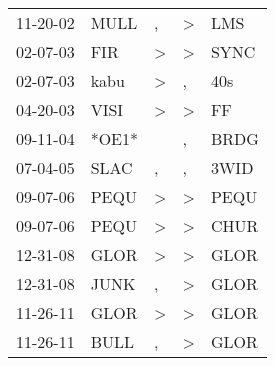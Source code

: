 \begin{supertabular}{lllll}
 11-20-02 &   MULL &             , &  \textgreater &   LMS \\
 02-07-03 &    FIR &  \textgreater &  \textgreater &  SYNC \\
 02-07-03 &   kabu &  \textgreater &             , &   40s \\
 04-20-03 &   VISI &  \textgreater &  \textgreater &    FF \\
 09-11-04 &  *OE1* &               &             , &  BRDG \\
 07-04-05 &   SLAC &             , &             , &  3WID \\
 09-07-06 &   PEQU &  \textgreater &  \textgreater &  PEQU \\
 09-07-06 &   PEQU &  \textgreater &  \textgreater &  CHUR \\
 12-31-08 &   GLOR &  \textgreater &  \textgreater &  GLOR \\
 12-31-08 &   JUNK &             , &  \textgreater &  GLOR \\
 11-26-11 &   GLOR &  \textgreater &  \textgreater &  GLOR \\
 11-26-11 &   BULL &             , &  \textgreater &  GLOR \\
\end{supertabular}
